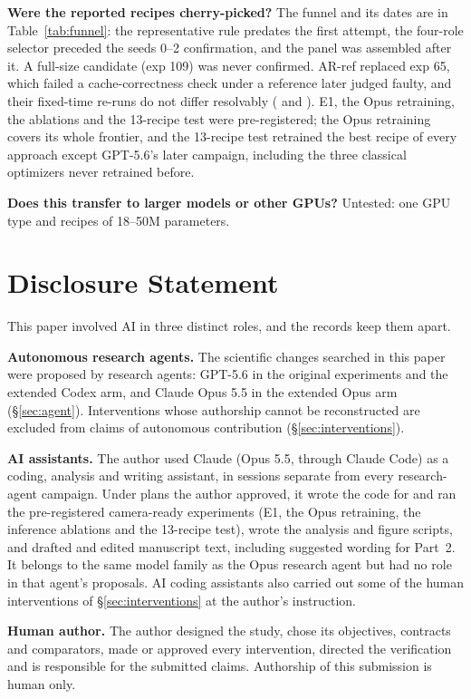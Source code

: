 \documentclass{article}
\newif\ifshowhumanmarkers \showhumanmarkersfalse
\newcommand{\humantag}[1]{{\color{humanframe}\sffamily\scriptsize\bfseries HUMAN AUTHOR MUST REWRITE/VERIFY [#1]}\ }
\newcommand{\humanauthor}[2][]{\ifshowhumanmarkers\begin{humanbox}\humantag{#1}#2\end{humanbox}\else #2\par\fi}
\begin{document}
\textbf{Were the reported recipes cherry-picked?} The funnel and its dates are in Table~\ref{tab:funnel}: the representative rule predates the first attempt, the four-role selector preceded the seeds 0--2 confirmation, and the panel was assembled after it. A full-size candidate (exp 109) was never confirmed. AR-ref replaced exp 65, which failed a cache-correctness check under a reference later judged faulty, and their fixed-time re-runs do not differ resolvably (\CRFixedSixtyFive{} and \CRFixedSixtyEight). E1, the Opus retraining, the ablations and the 13-recipe test were pre-registered; the Opus retraining covers its whole frontier, and the 13-recipe test retrained the best recipe of every approach except GPT-5.6's later campaign, including the three classical optimizers never retrained before.

\textbf{Does this transfer to larger models or other GPUs?} Untested: one GPU type and recipes of 18--50M parameters.

\section{Disclosure Statement}
\humanauthor[Disclosure r6]{This paper involved AI in three distinct roles, and the records keep them apart.

\textbf{Autonomous research agents.} The scientific changes searched in this paper were proposed by research agents: GPT-5.6 in the original experiments and the extended Codex arm, and Claude Opus 5.5 in the extended Opus arm (\S\ref{sec:agent}). Interventions whose authorship cannot be reconstructed are excluded from claims of autonomous contribution (\S\ref{sec:interventions}).

\textbf{AI assistants.} The author used Claude (Opus 5.5, through Claude Code) as a coding, analysis and writing assistant, in sessions separate from every research-agent campaign. Under plans the author approved, it wrote the code for and ran the pre-registered camera-ready experiments (E1, the Opus retraining, the inference ablations and the 13-recipe test), wrote the analysis and figure scripts, and drafted and edited manuscript text, including suggested wording for Part~2. It belongs to the same model family as the Opus research agent but had no role in that agent's proposals. AI coding assistants also carried out some of the human interventions of \S\ref{sec:interventions} at the author's instruction.

\textbf{Human author.} The author designed the study, chose its objectives, contracts and comparators, made or approved every intervention, directed the verification and is responsible for the submitted claims. Authorship of this submission is human only.}

\clearpage


\end{document}

